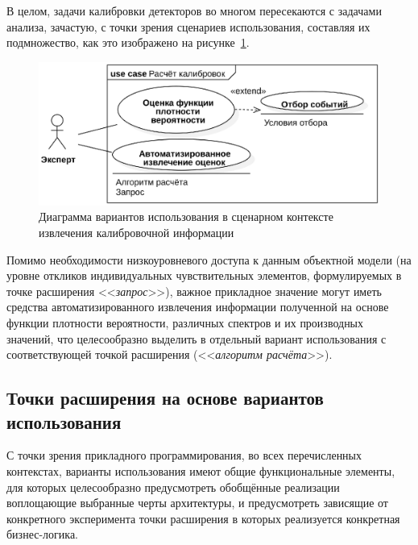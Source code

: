 В целом, задачи калибровки детекторов во многом пересекаются с задачами
анализа, зачастую, с точки зрения сценариев использования, составляя
их подмножество, как это изображено на рисунке~\ref{fig:usecases-get-calibrations}.

\begin{figure}[ht!]
    \centering
    \includegraphics[width=0.75\linewidth]{images/usecases/calibration-usecase.eps}
    \caption{Диаграмма вариантов использования в сценарном контексте извлечения калибровочной информации}
    \label{fig:usecases-get-calibrations}
\end{figure}

Помимо необходимости низкоуровневого доступа к данным объектной
модели (на уровне откликов индивидуальных чувствительных элементов,
формулируемых в точке расширения <<\emph{запрос}>>),
важное прикладное значение могут иметь средства автоматизированного
извлечения информации полученной на основе функции плотности
вероятности, различных спектров и их производных значений, что
целесообразно выделить в отдельный вариант использования с соответствующей
точкой расширения (<<\emph{алгоритм расчёта}>>).

\subsection{Точки расширения на основе вариантов использования}

С точки зрения прикладного программирования, во всех перечисленных
контекстах, варианты использования имеют общие функциональные
элементы, для которых целесообразно предусмотреть обобщённые
реализации воплощающие выбранные черты архитектуры, и
предусмотреть  зависящие от конкретного эксперимента точки
расширения в которых реализуется конкретная бизнес-логика.

